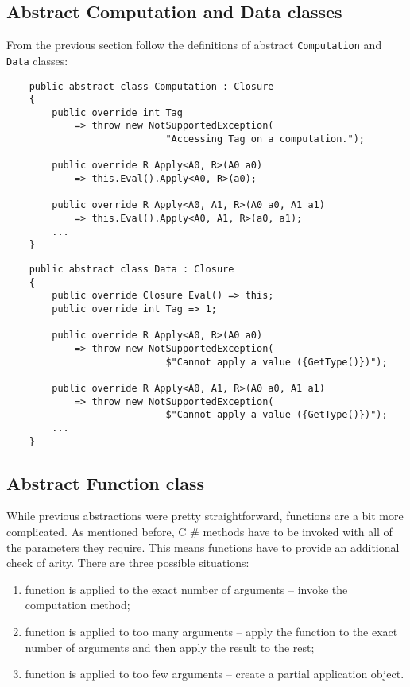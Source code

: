 \documentclass[en]{pracamgr}
\newcommand{\shrp}{%
  {\fontfamily{ppl}\selectfont\#%
  }}
\begin{document}
\subsection{Abstract Computation and Data classes}

From the previous section follow the definitions of  abstract \texttt{Computation} and \texttt{Data} classes:

\begin{verbatim}
    public abstract class Computation : Closure
    {
        public override int Tag
            => throw new NotSupportedException(
                            "Accessing Tag on a computation.");

        public override R Apply<A0, R>(A0 a0)
            => this.Eval().Apply<A0, R>(a0);

        public override R Apply<A0, A1, R>(A0 a0, A1 a1)
            => this.Eval().Apply<A0, A1, R>(a0, a1);
        ...
    }
\end{verbatim}
\begin{verbatim}
    public abstract class Data : Closure
    {
        public override Closure Eval() => this;
        public override int Tag => 1;

        public override R Apply<A0, R>(A0 a0)
            => throw new NotSupportedException(
                            $"Cannot apply a value ({GetType()})");

        public override R Apply<A0, A1, R>(A0 a0, A1 a1)
            => throw new NotSupportedException(
                            $"Cannot apply a value ({GetType()})");
        ...
    }
\end{verbatim}

\subsection{Abstract Function class}\label{s:function_class}

While previous abstractions were pretty straightforward,
functions are a bit more complicated. As mentioned before,
C\shrp{} methods have to be invoked with all of the
parameters they require.
This means functions have to provide an additional check of arity.
There are three possible situations:

\begin{enumerate}
    \item function is applied to the exact number of arguments
    -- invoke the computation method;
    \item function is applied to too many arguments
    -- apply the function to the exact number of arguments
    and then apply the result to the rest;
    \item function is applied to too few arguments 
    -- create a partial application object.
\end{enumerate}
\end{document}
